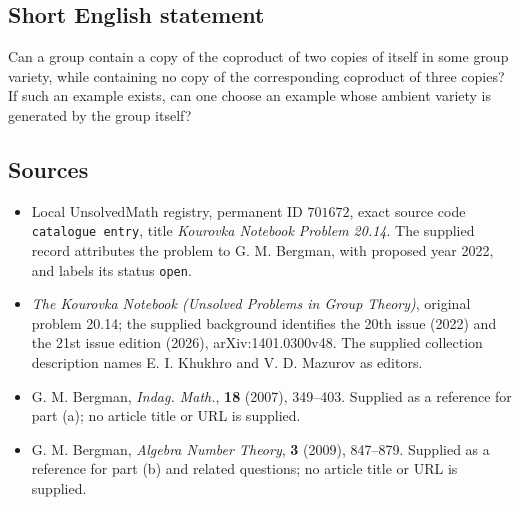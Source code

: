 \documentclass[11pt]{article}
\begin{document}
\subsection{Short English statement}
Can a group contain a copy of the coproduct of two copies of itself in some group variety, while containing no copy of the corresponding coproduct of three copies? If such an example exists, can one choose an example whose ambient variety is generated by the group itself?
\subsection{Sources}
\begin{itemize}
\item Local UnsolvedMath registry, permanent ID \(701672\), exact source code \texttt{catalogue entry}, title \emph{Kourovka Notebook Problem 20.14}. The supplied record attributes the problem to G. M. Bergman, with proposed year 2022, and labels its status \texttt{open}.
\item \emph{The Kourovka Notebook (Unsolved Problems in Group Theory)}, original problem 20.14; the supplied background identifies the 20th issue (2022) and the 21st issue edition (2026), arXiv:1401.0300v48. The supplied collection description names E. I. Khukhro and V. D. Mazurov as editors.
\item G. M. Bergman, \emph{Indag. Math.}, \textbf{18} (2007), 349--403. Supplied as a reference for part (a); no article title or URL is supplied.
\item G. M. Bergman, \emph{Algebra Number Theory}, \textbf{3} (2009), 847--879. Supplied as a reference for part (b) and related questions; no article title or URL is supplied.
\end{itemize}
\end{document}
